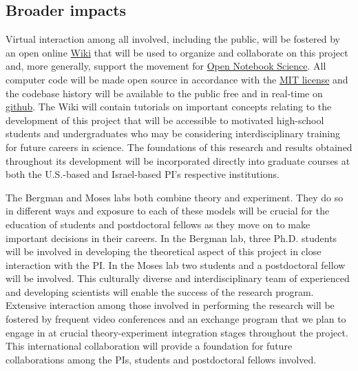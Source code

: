 \subsection{Broader impacts}
\noindent Virtual interaction among all involved, including the public, will be fostered by an open online \href{http://en.wikipedia.org/wiki/Wiki}{Wiki} that will be used to organize and collaborate on this project and, more generally, support the movement for \href{http://en.wikipedia.org/wiki/Open\_notebook\_science}{Open Notebook Science}. All computer code will be made open source in accordance with the \href{http://opensource.org/licenses/MIT}{MIT license} and the codebase history will be available to the public free and in real-time on \href{http://www.github.com}{github}. The Wiki will contain tutorials on important concepts relating to the development of this project that will be accessible to motivated high-school students and undergraduates who may be considering interdisciplinary training for future careers in science. The foundations of this research and results obtained throughout its development will be incorporated directly into graduate courses at both the U.S.-based and Israel-based PI’s respective institutions.

The Bergman and Moses labs both combine theory and experiment. They do so in different ways and exposure to each of these models will be crucial for the education of students and postdoctoral fellows as they move on to make important decisions in their careers. In the Bergman lab, three Ph.D. students will be involved in developing the theoretical aspect of this project in close interaction with the PI. In the Moses lab two students and a postdoctoral fellow will be involved. This culturally diverse and interdisciplinary team of experienced and developing scientists will enable the success of the research program. Extensive interaction among those involved in performing the research will be fostered by frequent video conferences and an exchange program that we plan to engage in at crucial theory-experiment integration stages throughout the project. This international collaboration will provide a foundation for future collaborations among the PIs, students and postdoctoral fellows involved.
\pagebreak